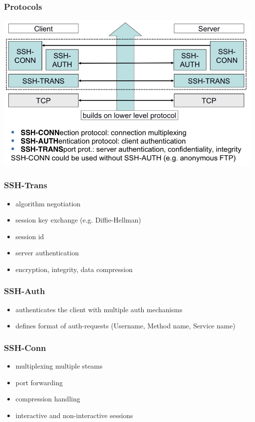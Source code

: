 \documentclass[english, leagacyboxes, nologo]{latex4ei/latex4ei_sheet}
\begin{document}
{  \subsubsection{Protocols}
  \includegraphics[width=\columnwidth]{img/sshproto.png}

  \subsubsection{SSH-Trans}
  \begin{itemize}
  \item algorithm negotiation
  \item session key exchange (e.g. Diffie-Hellman)
  \item session id
  \item server authentication
  \item encryption, integrity, data compression
  \end{itemize}

  \subsubsection{SSH-Auth}
  \begin{itemize}
  \item authenticates the client with multiple auth mechanisms
  \item defines format of auth-requests (Username, Method name, Service name)
  \end{itemize}

  \subsubsection{SSH-Conn}
  \begin{itemize}
  \item multiplexing multiple steams
  \item port forwarding
  \item compression handling
  \item interactive and non-interactive sessions
  \end{itemize}


}
\end{document}
